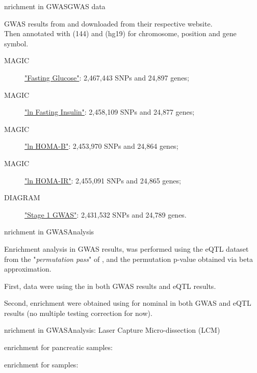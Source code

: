 \begin{frame}{nrichment in GWAS}{GWAS data}
\par{GWAS results from  and  downloaded from their respective website.\\
Then annotated with  (144) and  (hg19) for chromosome, position and gene symbol.
\begin{description}
    \item[MAGIC] \href{ftp://ftp.sanger.ac.uk/pub/magic/MAGIC_FastingGlucose.txt}{"Fasting Glucose"}: 2,467,443 SNPs and 24,897 genes;
    \item[MAGIC] \href{ftp://ftp.sanger.ac.uk/pub/magic/MAGIC_ln_FastingInsulin.txt}{"ln Fasting Insulin"}: 2,458,109 SNPs and 24,877 genes;
    \item[MAGIC] \href{ftp://ftp.sanger.ac.uk/pub/magic/MAGIC_ln_HOMA-B.txt}{"ln HOMA-B"}: 2,453,970 SNPs and 24,864 genes;
    \item[MAGIC] \href{ftp://ftp.sanger.ac.uk/pub/magic/MAGIC_ln_HOMA-IR.txt}{"ln HOMA-IR"}: 2,455,091 SNPs and 24,865 genes;
    \item[DIAGRAM] \href{http://diagram-consortium.org/downloads.html}{"Stage 1 GWAS"}: 2,431,532 SNPs and 24,789 genes.
\end{description}}
\end{frame}

\begin{frame}{nrichment in GWAS}{Analysis}
\par{Enrichment analysis in GWAS results, was performed using the eQTL dataset from the "\textit{permutation pass}" of , and the permutation p-value obtained via beta approximation.}
\vspace{2em}
\par{First, data were  using the  in both GWAS results and eQTL results.}
\vspace{2em}
\par{Second, enrichment were obtained using  for nominal  in both GWAS and eQTL results (no multiple testing correction for now).}
\end{frame}

\begin{frame}{nrichment in GWAS}{Analysis: Laser Capture Micro-dissection (LCM)}
\begin{center}
\par{ enrichment for  pancreatic samples:\\

}
\vspace{2em}
\par{ enrichment for  samples:\\

}
\end{center}
\end{frame}

